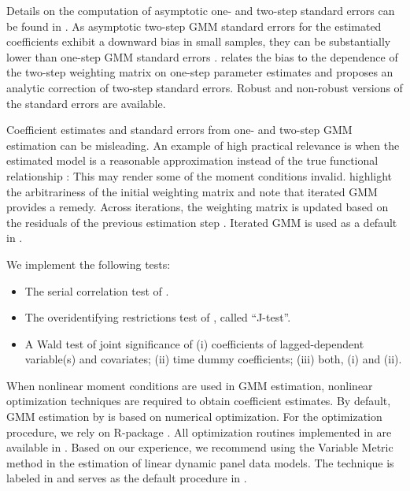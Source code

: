 Details on the computation of asymptotic one- and two-step standard errors can be found in \citet{DooAreBon2012dpd}.
As asymptotic two-step GMM standard errors for the estimated coefficients exhibit a downward bias in small samples, they can be substantially lower than one-step GMM standard errors \citep[see, e.g.,][]{AreBon1991}. \citet{Win2005} relates the bias to the dependence of the two-step weighting matrix on one-step parameter estimates and proposes an analytic correction of two-step standard errors.
Robust and non-robust versions of the standard errors are available.

Coefficient estimates and standard errors from one- and two-step GMM estimation can be misleading. An example of high practical relevance is when the estimated model is a reasonable approximation instead of the true functional relationship \citep{HansenLee2020, HwangKangLee2020}: This may render some of the moment conditions invalid. \citet{HansenLee2020} highlight the arbitrariness of the initial weighting matrix and note that iterated GMM provides a remedy. Across iterations, the weighting matrix is updated based on the residuals of the previous estimation step \citep[for more details, see][p. 4--6]{HansenLee2020}. Iterated GMM is used as a default in .


We implement the following tests:
\begin{itemize}
\item The serial correlation test of \citet{Are2003}.
\item The overidentifying restrictions test of \citet{Han1982large}, called ``J-test''.
\item A Wald test of joint significance of (i) coefficients of lagged-dependent variable(s) and covariates; (ii) time dummy coefficients; (iii) both, (i) and (ii).
\end{itemize}




When nonlinear moment conditions are used in GMM estimation, nonlinear optimization techniques are required to obtain coefficient estimates. By default, GMM estimation by  is based on numerical optimization.
For the optimization procedure, we rely on R-package  \citep{NasVar2011,Nas2014}. All optimization routines implemented in  are available in . Based on our experience, we recommend using the Variable Metric method \citep{Fle1970new,Nas1990compact,Nas2020} in the estimation of linear dynamic panel data models.
The technique is labeled  in  and serves as the default procedure in .


















